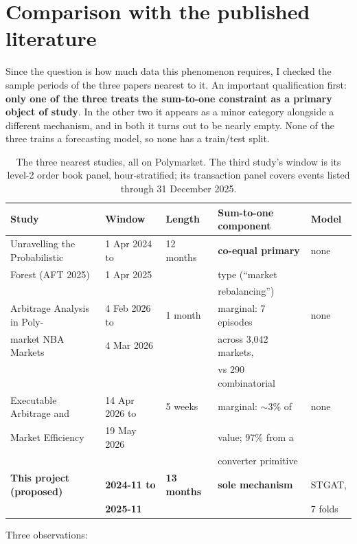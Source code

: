 \documentclass[11pt,a4paper]{article}
\begin{document}
\section{Comparison with the published literature}
\label{sec:lit}

Since the question is how much data this phenomenon requires, I checked the
sample periods of the three papers nearest to it. An important qualification
first: \textbf{only one of the three treats the sum-to-one constraint as a
primary object of study}. In the other two it appears as a minor category
alongside a different mechanism, and in both it turns out to be nearly empty.
None of the three trains a forecasting model, so none has a train/test split.

\begin{table}[ht]
\centering\small
\begin{tabular}{lllll}
\toprule
Study & Window & Length & Sum-to-one component & Model \\
\midrule
Unravelling the Probabilistic & 1 Apr 2024 to & 12 months & \textbf{co-equal primary} & none \\
\quad Forest (AFT 2025) & 1 Apr 2025 & & type (``market & \\
 & & & rebalancing'') & \\[3pt]
Arbitrage Analysis in Poly- & 4 Feb 2026 to & 1 month & marginal: 7 episodes & none \\
\quad market NBA Markets & 4 Mar 2026 & & across 3,042 markets, & \\
 & & & vs 290 combinatorial & \\[3pt]
Executable Arbitrage and & 14 Apr 2026 to & 5 weeks & marginal: $\sim$3\% of & none \\
\quad Market Efficiency & 19 May 2026 & & value; 97\% from a & \\
 & & & converter primitive & \\
\midrule
\textbf{This project (proposed)} & \textbf{2024-11 to} & \textbf{13 months} & \textbf{sole mechanism} & STGAT, \\
 & \textbf{2025-11} & & & 7 folds \\
\bottomrule
\end{tabular}
\caption{The three nearest studies, all on Polymarket. The third study's
window is its level-2 order book panel, hour-stratified; its transaction
panel covers events listed through 31 December 2025.}
\end{table}

Three observations:
\end{document}
